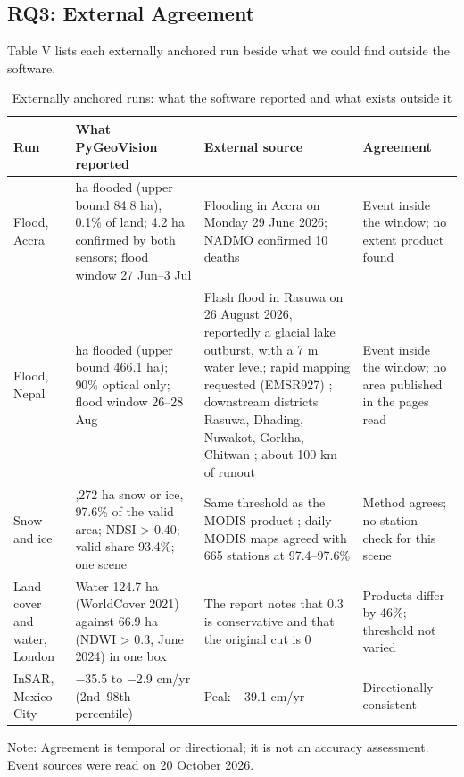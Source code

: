\documentclass[conference]{IEEEtran}
\newlength{\tabw}
\begin{document}
\subsection{RQ3: External Agreement}

Table V lists each externally anchored run beside what we could find outside the software.

\begin{table}[!t]
\caption{Externally anchored runs: what the software reported and what exists outside it}
\centering
{\footnotesize\setlength{\tabcolsep}{2.5pt}\renewcommand{\arraystretch}{1.12}\setlength{\tabw}{\dimexpr\textwidth-8\tabcolsep\relax}
\begin{tabular}{>{\raggedright\arraybackslash}p{}>{\raggedright\arraybackslash}p{}>{\raggedright\arraybackslash}p{}>{\raggedright\arraybackslash}p{}}
\toprule
\textbf{Run} & \textbf{What PyGeoVision reported} & \textbf{External source} & \textbf{Agreement} \\
\midrule
Flood, Accra & 81.4 ha flooded (upper bound 84.8 ha), 0.1\% of land; 4.2 ha confirmed by both sensors; flood window 27 Jun--3 Jul & Flooding in Accra on Monday 29 June 2026; NADMO confirmed 10 deaths \cite{citi2026accra} & Event inside the window; no extent product found \\
Flood, Nepal & 451.7 ha flooded (upper bound 466.1 ha); 90\% optical only; flood window 26--28 Aug & Flash flood in Rasuwa on 26 August 2026, reportedly a glacial lake outburst, with a 7 m water level; rapid mapping requested (EMSR927) \cite{cems2026emsr927}; downstream districts Rasuwa, Dhading, Nuwakot, Gorkha, Chitwan \cite{nrsc2026trishuli}; about 100 km of runout \cite{roy2026nepalfloods} & Event inside the window; no area published in the pages read \\
Snow and ice & 93,272 ha snow or ice, 97.6\% of the valid area; NDSI > 0.40; valid share 93.4\%; one scene & Same threshold as the MODIS product \cite{hall1995ndsi}; daily MODIS maps agreed with 665 stations at 97.4--97.6\% \cite{tong2020snow} & Method agrees; no station check for this scene \\
Land cover and water, London & Water 124.7 ha (WorldCover 2021) against 66.9 ha (NDWI > 0.3, June 2024) in one box & The report notes that 0.3 is conservative and that the original cut is 0 \cite{mcfeeters1996ndwi} & Products differ by 46\%; threshold not varied \\
InSAR, Mexico City & $-$35.5 to $-$2.9 cm/yr (2nd--98th percentile) & Peak $-$39.1 cm/yr \cite{cigna2021mexico} & Directionally consistent \\
\bottomrule
\end{tabular}
\par\vspace{2pt}\begin{minipage}{\textwidth}\raggedright\scriptsize Note: Agreement is temporal or directional; it is not an accuracy assessment. Event sources were read on 20 October 2026.\end{minipage}
}
\end{table}
\end{document}
